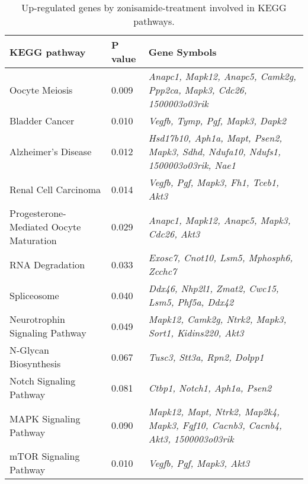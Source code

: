 \documentclass{article}
\begin{document}
\begin{table}
\caption{Up-regulated genes by zonisamide-treatment involved in KEGG pathways.}
\begin{small}
\begin{tabular}{l l p{2.5in}}
\hline
KEGG pathway & P value & Gene Symbols \\
\hline
Oocyte Meiosis & 0.009 &  {\it Anapc1, Mapk12, Anapc5, Camk2g, Ppp2ca, Mapk3, Cdc26, 1500003o03rik } \\
Bladder Cancer &	0.010 &	{\it Vegfb, Tymp, Pgf, Mapk3, Dapk2 } \\
Alzheimer's Disease	& 0.012 &	{\it Hsd17b10, Aph1a, Mapt, Psen2, Mapk3, Sdhd, Ndufa10, Ndufs1, 1500003o03rik, Nae1 }\\
Renal Cell Carcinoma	& 0.014 &	{\it Vegfb, Pgf, Mapk3, Fh1, Tceb1, Akt3 } \\
Progesterone-Mediated Oocyte Maturation	& 0.029 &	{\it Anapc1, Mapk12, Anapc5, Mapk3, Cdc26, Akt3 }\\ 
RNA Degradation	& 0.033 &	{\it Exosc7, Cnot10, Lsm5, Mphosph6, Zcchc7 } \\
Spliceosome	& 0.040 &	{\it Ddx46, Nhp2l1, Zmat2, Cwc15, Lsm5, Phf5a, Ddx42 } \\
Neurotrophin Signaling Pathway &	0.049 &	{\it Mapk12, Camk2g, Ntrk2, Mapk3, Sort1, Kidins220, Akt3 } \\
N-Glycan Biosynthesis	& 0.067 &	{\it Tusc3, Stt3a, Rpn2, Dolpp1 } \\
Notch Signaling Pathway	& 0.081 &	{\it Ctbp1, Notch1, Aph1a, Psen2 } \\
MAPK Signaling Pathway	& 0.090 &	{\it Mapk12, Mapt, Ntrk2, Map2k4, Mapk3, Fgf10, Cacnb3, Cacnb4, Akt3, 1500003o03rik }\\
mTOR Signaling Pathway	& 0.010 &	{\it Vegfb, Pgf, Mapk3, Akt3 }\\

\hline
\end{tabular}

\end{small}
\label{table:tabzo2}
\end{table}
\end{document}
